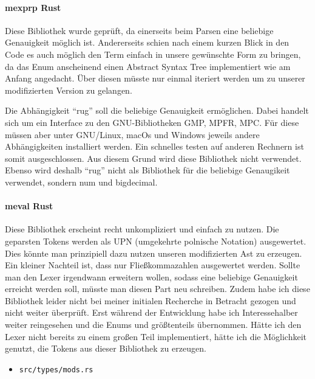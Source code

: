 \documentclass[11pt,a4paper, ngerman]{article}
\begin{document}
\paragraph{mexprp Rust} \cite{CrateMexprp} Diese Bibliothek wurde geprüft, da einerseits beim Parsen eine beliebige Genauigkeit möglich ist. Andererseits schien nach einem kurzen Blick in den Code es auch möglich den Term einfach in unsere gewünschte Form zu bringen, da das Enum  anscheinend einen Abstract Syntax Tree implementiert wie am Anfang angedacht. Über diesen müsste nur einmal iteriert werden um zu unserer modifizierten Version zu gelangen.

Die Abhängigkeit ``rug'' soll die beliebige Genauigkeit ermöglichen. Dabei handelt sich um ein Interface zu den GNU-Bibliotheken GMP, MPFR, MPC. Für diese müssen aber unter GNU/Linux, macOs und Windows jeweils andere Abhängigkeiten installiert werden. Ein schnelles testen auf anderen Rechnern ist somit ausgeschlossen. Aus diesem Grund wird diese Bibliothek nicht verwendet. Ebenso wird deshalb ``rug'' nicht als Bibliothek für die beliebige Genaugikeit verwendet, sondern num und bigdecimal.

\paragraph{meval Rust} \cite{CrateMeval} Diese Bibliothek erscheint recht unkompliziert und einfach zu nutzen. Die geparsten Tokens werden als UPN (umgekehrte polnische Notation) ausgewertet. Dies könnte man prinzipiell dazu nutzen unseren modifizierten Ast zu erzeugen. Ein kleiner Nachteil ist, dass nur Fließkommazahlen ausgewertet werden. Sollte man den Lexer irgendwann erweitern wollen, sodass eine beliebige Genauigkeit erreicht werden soll, müsste man diesen Part neu schreiben. Zudem habe ich diese Bibliothek leider nicht bei meiner initialen Recherche in Betracht gezogen und nicht weiter überprüft. Erst während der Entwicklung habe ich Interessehalber weiter reingesehen und die Enums  und  größtenteils übernommen. Hätte ich den Lexer nicht bereits zu einem großen Teil implementiert, hätte ich die Möglichkeit genutzt, die Tokens aus dieser Bibliothek zu erzeugen.

\begin{itemize}
    \item \begin{verbatim}src/types/mods.rs\end{verbatim}
\end{itemize}
\end{document}
